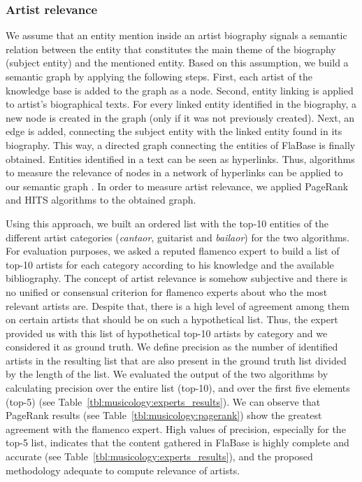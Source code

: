 \subsubsection{Artist relevance}
\label{sec:musicology:relevance}

We assume that an entity mention inside an artist biography signals a semantic relation between the entity that constitutes the main theme of the biography (subject entity) and the mentioned entity. Based on this assumption, we build a semantic graph by applying the following steps. First, each artist of the knowledge base is added to the graph as a node. Second, entity linking is applied to artist's biographical texts. For every linked entity identified in the biography, a new node is created in the graph (only if it was not previously created). Next, an edge is added, connecting the subject entity with the linked entity found in its biography. This way, a directed graph connecting the entities of FlaBase is finally obtained. Entities identified in a text can be seen as hyperlinks. Thus, algorithms to measure the relevance of nodes in a network of hyperlinks can be applied to our semantic graph \citep{Bellomi2005}. In order to measure artist relevance, we applied PageRank \citep{Brin1998} and HITS \citep{Kleinberg1999} algorithms to the obtained graph. 

Using this approach, we built an ordered list with the top-10 entities of the different artist categories (\textit{cantaor}, guitarist and \textit{bailaor}) for the two algorithms. For evaluation purposes, we asked a reputed flamenco expert to build a list of top-10 artists for each category according to his knowledge and the available bibliography. The concept of artist relevance is somehow subjective and there is no unified or consensual criterion for flamenco experts about who the most relevant artists are. Despite that, there is a high level of agreement among them on certain artists that should be on such a hypothetical list. Thus, the expert provided us with this list of hypothetical top-10 artists by category and we considered it as ground truth. We define precision as the number of identified artists in the resulting list that are also present in the ground truth list divided by the length of the list. We evaluated the output of the two algorithms by calculating precision over the entire list (top-10), and over the first five elements (top-5) (see Table~\ref{tbl:musicology:experts_results}). We can observe that Page\-Rank results (see Table~\ref{tbl:musicology:pagerank}) show the greatest agreement with the flamenco expert. 
High values of precision, especially for the top-5 list, indicates that the content gathered in FlaBase is highly complete and accurate (see Table~\ref{tbl:musicology:experts_results}), and the proposed methodology adequate to compute relevance of artists. 

